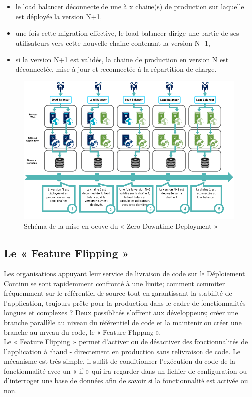         \begin{itemize}
          \item le load balancer déconnecte de une à x chaine(s) de production sur laquelle est déployée la version N+1,
          \item une fois cette migration effective, le load balancer dirige une partie de ses utilisateurs vers cette nouvelle chaine contenant la version N+1,
          \item si la version N+1 est validée, la chaine de production en version N est déconnectée, mise à jour et reconnectée à la répartition de charge.\\
        \end{itemize}

        \begin{figure}
          \begin{center}
            \includegraphics[scale=0.6]{images/LoadBalancer.png}
          \end{center}
          \caption{Schéma de la mise en oeuve du « Zero Downtime Deployment »}
          \label{LoadBalancer}
        \end{figure}

      \subsection{Le « Feature Flipping »}
      Les organisations appuyant leur service de livraison de code sur le Déploiement Continu se sont rapidemment confronté à une limite; comment commiter fréquemment sur le référentiel de source tout en garantissant la stabilité de l’application, toujours prête pour la production dans le cadre de fonctionnalités longues et complexes ? Deux possiblités s'offrent aux développeurs; créer une branche parallèle au niveau du référentiel de code et la maintenir ou créer une branche au niveau du code, le « Feature Flipping ».\\
      Le « Feature Flipping » permet d'activer ou de désactiver des fonctionnalités de l'application à chaud - directement en production sans relivraison de code. Le mécanisme est très simple, il suffit de conditionner l'exécution du code de la fonctionnalité avec un « if » qui ira regarder dans un fichier de configuration ou d'interroger une base de données afin de savoir si la fonctionnalité est activée ou non.\\

